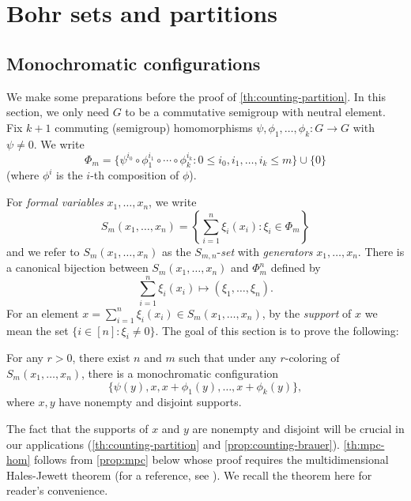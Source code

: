 \section{Bohr sets and partitions}
\label{sec:partition}

\subsection{Monochromatic configurations}
We make some preparations before the proof of \cref{th:counting-partition}. In this section, we only need $G$ to be a commutative semigroup with neutral element. Fix $k+1$ commuting (semigroup)  homomorphisms $\psi, \phi_1, \ldots, \phi_k: G \rightarrow G$ with $\psi \neq 0$. 
We write 
\[
\Phi_m = \{ \psi^{i_0} \circ \phi_1^{i_1} \circ \cdots \circ \phi_k^{i_k} : 0 \leq i_0, i_1, \ldots, i_k \leq m \} \cup \{ 0 \}
\] (where $\phi^i$ is the $i$-th composition of $\phi$).

For \textit{formal variables} $x_1, \ldots, x_n$, we write
\[
S_m(x_1,\ldots, x_n) = \left\{ \sum_{i=1}^n \xi_i (x_i) : \xi_i \in \Phi_m \right\} 
\]
and we refer to $S_m(x_1,\ldots, x_n)$ as the $S_{m,n}$-\textit{set} with \textit{generators} $x_1, \ldots, x_n$. There is a canonical bijection between $S_m(x_1, \ldots, x_n)$ and $\Phi_m^n$ defined by
\[
    \sum_{i=1}^n \xi_i(x_i) \mapsto (\xi_1, \ldots, \xi_n).
\]
 For an element $x = \sum_{i=1}^n \xi_i (x_i) \in S_m(x_1,\ldots, x_n)$, by the \textit{support} of $x$ we mean the set $\{ i \in [n]: \xi_i \neq 0\}$.
The goal of this section is to prove the following:

\begin{theorem} \label{th:mpc-hom} 
For any $r > 0$, there exist $n$ and $m$ such that under any $r$-coloring of $S_m(x_1,\ldots, x_n)$, there is a monochromatic configuration
\[
\{ \psi(y), x, x + \phi_1(y), \ldots, x+ \phi_k(y) \},
\]
where $x, y$ have nonempty and disjoint supports.
\end{theorem}
The fact that the supports of $x$ and $y$ are nonempty and disjoint will be crucial in our applications (\cref{th:counting-partition} and \cref{prop:counting-brauer}). \cref{th:mpc-hom} follows from \cref{prop:mpc} below whose proof requires the multidimensional Hales-Jewett theorem (for a reference, see \cite[Theorem 7, p.40]{ramsey-book}). We recall the theorem here for reader's convenience.


